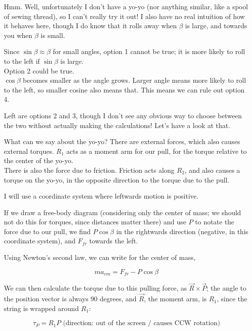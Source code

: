 \documentclass[12pt,a4paper]{report}
\begin{document}
Hmm. Well, unfortunately I don't have a yo-yo (nor anything similar, like a spool of sewing thread), so I can't really try it out! I also have no real intuition of how it behaves here, though I do know that it rolls away when $\beta$ is large, and towards you when $\beta$ is small.

Since $\sin \beta \approx \beta$ for small angles, option 1 cannot be true; it is more likely to roll to the left if $\sin \beta$ is large.\\
Option 2 could be true.\\
$\cos \beta$ becomes smaller as the angle grows. Larger angle means more likely to roll to the left, so smaller cosine also means that. This means we can rule out option 4.

Left are options 2 and 3, though I don't see any obvious way to choose between the two without actually making the calculations! Let's have a look at that.

What can we say about the yo-yo? There are external forces, which also causes external torques. $R_1$ acts as a moment arm for our pull, for the torque relative to the center of the yo-yo.\\
There is also the force due to friction. Friction acts along $R_2$, and also causes a torque on the yo-yo, in the opposite direction to the torque due to the pull.

I will use a coordinate system where leftwards motion is positive.

If we draw a free-body diagram (considering only the center of mass; we should not do this for torques, since distances matter there) and use $P$ to notate the force due to our pull, we find $P \cos \beta$ in the rightwards direction (negative, in this coordinate system), and $F_{fr}$ towards the left.

Using Newton's second law, we can write for the center of mass,

\begin{equation}
m a_{cm} = F_{fr} - P \cos \beta
\end{equation}

We can then calculate the torque due to this pulling force, as $\vec{R} \times \vec{P}$; the angle to the position vector is always 90 degrees, and $\vec{R}$, the moment arm, is $R_1$, since the string is wrapped around $R_1$:

\begin{equation}
\tau_P = R_1 P \text{ (direction: out of the screen / causes CCW rotation)}
\end{equation}
\end{document}
